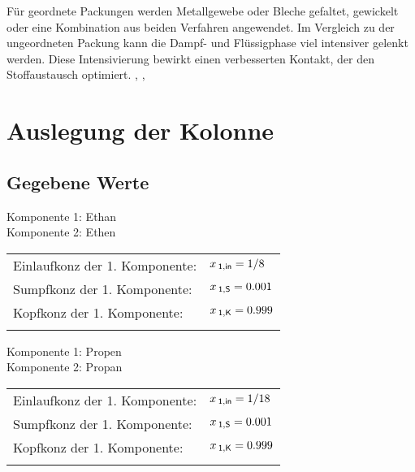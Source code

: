 \documentclass[12pt,a4paper,bibtotocnumbered,liststotocnumbered]{scrreprt}
\begin{document}
Für geordnete Packungen werden Metallgewebe oder Bleche gefaltet, gewickelt oder eine Kombination aus beiden Verfahren angewendet. Im Vergleich zu der ungeordneten Packung kann die Dampf- und Flüssigphase viel intensiver gelenkt werden. Diese Intensivierung bewirkt einen verbesserten Kontakt, der den Stoffaustausch optimiert. \cite{Funktion_und_Aufbau}, \cite{Brehm},\cite{Schneider2}

\chapter{Auslegung der Kolonne} 
\section{Gegebene Werte}
Komponente 1: Ethan\\
Komponente 2: Ethen\\
\begin{tabular}{ll}
Einlaufkonz der 1. Komponente:& $x_{\: \mathsf{1,in}} = 1/8$\\
Sumpfkonz der 1. Komponente: &$x_{\: \mathsf{1,S}} = 0.001$\\
Kopfkonz der 1. Komponente: &$x_{\: \mathsf{1,K}} = 0.999$ \\ \\
\end{tabular}


Komponente 1: Propen\\
Komponente 2: Propan\\
\begin{tabular}{ll}
Einlaufkonz der 1. Komponente:& $x_{\: \mathsf{1,in}} = 1/18$\\
Sumpfkonz der 1. Komponente: &$x_{\: \mathsf{1,S}} = 0.001$\\
Kopfkonz der 1. Komponente: &$x_{\: \mathsf{1,K}} = 0.999$ \\ \\
\end{tabular}
\end{document}
